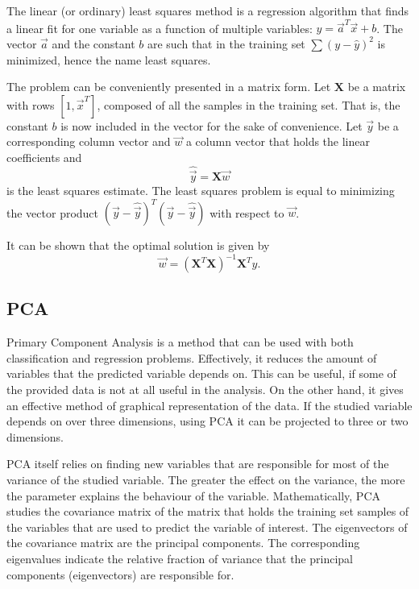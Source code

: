 \documentclass[twoside]{article}
\renewcommand{\v}[1]{\vec{#1}}
\begin{document}
\begin{multicols}{2}
The linear (or ordinary) least squares method is a regression algorithm that
finds a linear fit for one variable as a function of multiple variables: $\hat{y} = \v{a}^T \v{x}+b$. 
The vector $\v{a}$ and the constant $b$ are such that in the training set $\sum (y - \hat{y})^2$ is 
minimized, hence the name least squares.

The problem can be conveniently presented in a matrix form. Let $\mathbf{X}$ be a matrix
with rows $[1, \v{x}^T]$, composed of all the samples in the training set. That is, the 
constant $b$ is now included in the vector for the sake of convenience. Let $\v{y}$ be
a corresponding column vector and $\v{w}$ a column vector that holds the linear coefficients and
\begin{equation}
\hat{\v{y}} = \mathbf{X} \v{w}
\end{equation}
is the least squares estimate. The least squares problem is equal to minimizing the
vector product $(\v{y} - \hat{\v{y}})^T(\v{y} - \hat{\v{y}})$ with respect to $\v{w}$. 

It can be shown that the optimal solution is given by 
\begin{equation}
 \v{w} = (\mathbf{X}^T \mathbf{X})^{-1} \mathbf{X}^T y.
\end{equation}

\subsection{PCA}\label{method:pca}

Primary Component Analysis is a method that can be used with both classification and regression
problems. Effectively, it reduces the amount of variables that the predicted variable depends
on. This can be useful, if some of the provided data is not at all useful in the analysis. On the other
hand, it gives an effective method of graphical representation of the data. If the studied variable
depends on over three dimensions, using PCA it can be projected to three or two dimensions.

PCA itself relies on finding new variables that are responsible for most of the variance of the studied
variable. The greater the effect on the variance, the more the parameter explains the behaviour of the variable.
Mathematically, PCA studies the covariance matrix of the matrix that holds the training set samples of the 
variables that are used to predict the variable of interest. The eigenvectors of the covariance matrix are
the principal components. The corresponding eigenvalues indicate the relative fraction of variance that
the principal components (eigenvectors) are responsible for. 


\end{multicols}
\end{document}
